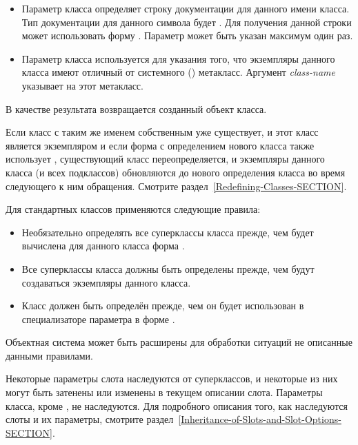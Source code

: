 \begin{defmac}
\begin{itemize}
\item 
Параметр класса  определяет строку документации для данного
имени класса. Тип документации для данного символа будет . Для
получения данной строки может использовать форму . Параметр  может быть указан
максимум один раз.

\item 
Параметр класса  используется для указания того, что экземпляры
данного класса имеют отличный от системного ()
метакласс. Аргумент \emph{class-name} указывает на этот метакласс.
\end{itemize}

В качестве результата возвращается созданный объект класса.

Если класс с таким же именем собственным уже существует, и этот класс является
экземпляром  и если форма  с определением
нового класса также использует , существующий класс
переопределяется, и экземпляры данного класса (и всех подклассов) обновляются до
нового определения класса во время следующего к ним обращения. Смотрите
раздел~\ref{Redefining-Classes-SECTION}.

Для стандартных классов применяются следующие правила:

\begin{itemize}

\item 
Необязательно определять все суперклассы класса прежде, чем будет вычислена для
данного класса форма .

\item 
Все суперклассы класса должны быть определены прежде, чем будут создаваться
экземпляры данного класса.

\item 
Класс должен быть определён прежде, чем он будет использован в специализаторе
параметра в форме .
\end{itemize}

Объектная система может быть расширены для обработки ситуаций не описанные
данными правилами.

Некоторые параметры слота наследуются от суперклассов, и некоторые из них могут
быть затенены или изменены в текущем описании слота. Параметры класса, кроме
, не наследуются. Для подробного описания того, как
наследуются слоты и их параметры, смотрите
раздел~\ref{Inheritance-of-Slots-and-Slot-Options-SECTION}. 


\end{defmac}
